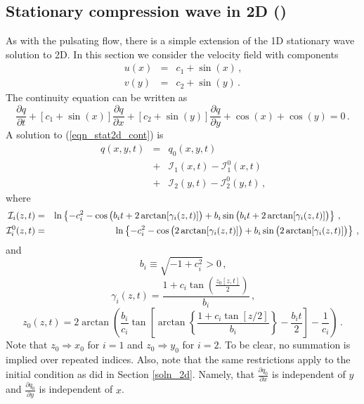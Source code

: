 \documentclass[11pt]{book}
\begin{document}
\subsection{Stationary compression wave in 2D (\texorpdfstring{}{compression\_wave})}
\label{stationary_2d}

As with the pulsating flow, there is a simple extension of the 1D stationary wave solution to 2D.  In this section we consider the velocity field with components
\begin{eqnarray}
u(x) &=& c_1 + \sin(x) \,\mbox{,} \\
v(y) &=& c_2 + \sin(y) \,\mbox{.}
\end{eqnarray}
The continuity equation can be written as
\begin{equation}
\label{eqn_stat2d_cont}
\frac{\partial q}{\partial t} + [c_1 + \sin(x)] \frac{\partial q}{\partial x} + [c_2 + \sin(y)] \frac{\partial q}{\partial y} + \cos(x) + \cos(y) = 0 \,\mbox{.}
\end{equation}
A solution to (\ref{eqn_stat2d_cont}) is
\begin{eqnarray}
\label{eqn_stat2d_soln}
q(x,y,t) &=& q_0(x,y,t) \nonumber\\
&+& \mathcal{I}_1(x,t) - \mathcal{I}_1^0(x,t) \nonumber\\
&+& \mathcal{I}_2(y,t) - \mathcal{I}_2^0(y,t) \,\mbox{,}
\end{eqnarray}
where
\begin{eqnarray}
\label{eqn_Ii}
\mathcal{I}_i(z,t) &=& \ln\left\{ -c_i^2 - \cos\big(b_i t + 2\arctan[\gamma_i(z,t)] \big) + b_i \sin\big(b_i t + 2\arctan[\gamma_i(z,t)] \big) \right\}\,\mbox{,} \quad\quad  \vspace{0.3cm}\\
\label{eqn_Ii0}
\mathcal{I}_i^0(z,t) &=& \ln\left\{ -c_i^2 - \cos\big(2\arctan[\gamma_i(z,t)] \big) + b_i \sin\big(2\arctan[\gamma_i(z,t)] \big) \right\} \,\mbox{,}
\end{eqnarray}
and
\begin{equation}
b_i \equiv \sqrt{-1 + c_i^2} >0 \,\mbox{,}
\end{equation}
\begin{equation}
\gamma_i(z,t) = \frac{ 1 + c_i \tan\left( \frac{z_0[z,t]}{2} \right) }{b_i} \,\mbox{,}
\end{equation}
\begin{equation}
z_0(z,t) = 2\arctan\left( \frac{b_i}{c_i} \tan \left[ \arctan\left\{ \frac{1+c_i\tan[z/2]}{b_i} \right\} - \frac{b_it}{2} \right] - \frac{1}{c_i} \right) \,\mbox{.}
\end{equation}
Note that $z_0 \Rightarrow x_0$ for $i=1$ and $z_0 \Rightarrow y_0$ for $i=2$.  To be clear, no summation is implied over repeated indices. Also, note that the same restrictions apply to the initial condition as did in Section \ref{soln_2d}. Namely, that $\frac{\partial q_0}{\partial x}$ is independent of $y$ and $\frac{\partial q_0}{\partial y}$ is independent of $x$.
\end{document}
